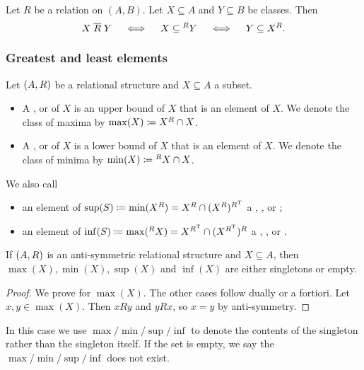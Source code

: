 \begin{lemma}
Let $R$ be a relation on $(A,B)$. Let $X\subseteq A$ and $Y\subseteq B$ be classes. Then
\[ X \mathrel{\overline{R}} Y \quad\iff\quad X \subseteq {^RY} \quad\iff\quad Y \subseteq X^R. \]
\end{lemma}

\subsubsection{Greatest and least elements}
\begin{definition}
Let $\left( A, R \right)$ be a relational structure and $X\subseteq A$ a subset.
\begin{itemize}
\item A ,  or  of $X$ is an upper bound of $X$ that is an element of $X$. We denote the class of maxima by $\max(X) \coloneqq X^R\cap X$.
\item A ,  or  of $X$ is a lower bound of $X$ that is an element of $X$. We denote the class of minima by $\min(X) \coloneqq {^RX}\cap X$.
\end{itemize}
We also call
\begin{itemize}
\item an element of $\sup(S) \coloneqq \min(X^R) = X^R \cap (X^R)^{R^{\mathrm{T}}}$ a , , or ;
\item an element of $\inf(S) \coloneqq \max({^RX}) = X^{R^{\mathrm{T}}} \cap (X^{R^{\mathrm{T}}})^R$ a , , or .
\end{itemize}
\end{definition}

\begin{lemma} \label{minMaxSingletons}
If $\left( A, R \right)$ is an anti-symmetric relational structure and $X\subseteq A$, then $\max(X), \min(X), \sup(X)$ and $\inf(X)$ are either singletons or empty.
\end{lemma}
\begin{proof}
We prove for $\max(X)$. The other cases follow dually or a fortiori. Let $x,y\in \max(X)$. Then $xRy$ and $yRx$, so $x=y$ by anti-symmetry.
\end{proof}
In this case we use $\max/\min/\sup/\inf$ to denote the contents of the singleton rather than the singleton itself. If the set is empty, we say the $\max/\min/\sup/\inf$ does not exist.

